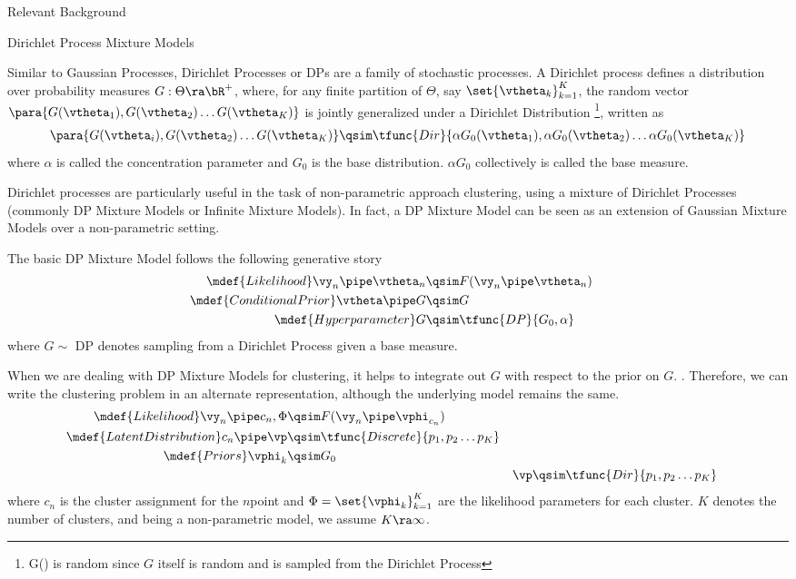 \documentclass{article}
\begin{document}
\begin{psection}{Relevant Background}
\begin{psubsection}{Dirichlet Process Mixture Models}

	Similar to Gaussian Processes, Dirichlet Processes or DPs are a family of stochastic processes.
	A Dirichlet process defines a distribution over probability measures $G : \Theta \ra \bR^+$, where, for any finite partition of $\Theta$, say $\set{\vtheta_k}_{k = 1}^K$, the random vector $\para{G(\vtheta_1), G(\vtheta_2) \dots G(\vtheta_K)}$ is jointly generalized under a Dirichlet Distribution \citep{murphy} \footnote{G(\vtheta) is random since $G$ itself is random and is sampled from the Dirichlet Process}, written as
	\begin{align*}
		\para{G(\vtheta_i), G(\vtheta_2) \dots G(\vtheta_K)}	\qsim	\tfunc{Dir}{\alpha G_0(\vtheta_1), \alpha G_0(\vtheta_2) \dots \alpha G_0(\vtheta_K)}
	\end{align*}
	where $\alpha$ is called the concentration parameter and $G_0$ is the base distribution. $\alpha G_0$ collectively is called the base measure.

	Dirichlet processes are particularly useful in the task of non-parametric approach clustering, using a mixture of Dirichlet Processes \citep{dp-ferg, dp-anto} (commonly DP Mixture Models or Infinite Mixture Models).
	In fact, a DP Mixture Model can be seen as an extension of Gaussian Mixture Models over a non-parametric setting.

	The basic DP Mixture Model follows the following generative story
	\begin{align*}
		\mdef{Likelihood}			\vy_n \pipe \vtheta_n	&\qsim	F(\vy_n \pipe \vtheta_n) & \\
		\mdef{Conditional Prior}	\vtheta \pipe G			&\qsim	G \\
		\mdef{Hyperparameter}				G						&\qsim	\tfunc{DP}{G_0, \alpha}
	\end{align*}
	where $G \sim$ DP denotes sampling from a Dirichlet Process given a base measure.

	When we are dealing with DP Mixture Models for clustering, it helps to integrate out $G$ with respect to the prior on $G$. \citep{neal}. Therefore, we can write the clustering problem in an alternate representation, although the underlying model remains the same.
	\begin{align*}
		\mdef{Likelihood}			\vy_n \pipe c_n, \Phi	&\qsim	F(\vy_n \pipe \vphi_{c_n}) & \\
		\mdef{Latent Distribution}	c_n \pipe \vp			&\qsim	\tfunc{Discrete}{p_1, p_2 \dots p_K} \\
		\mdef{Priors}				\vphi_k					&\qsim	G_0 & \\
		&&							\vp						&\qsim	\tfunc{Dir}{p_1, p_2 \dots p_K}
	\end{align*}
	where $c_n$ is the cluster assignment for the $n$\tth point and $\Phi = \set{\vphi_k}_{k = 1}^{K}$ are the likelihood parameters for each cluster. $K$ denotes the number of clusters, and being a non-parametric model, we assume $K \ra \infty$.


\end{psubsection}
\end{psection}
\end{document}
